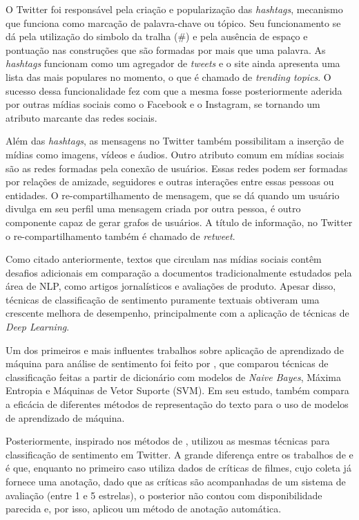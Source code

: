 O Twitter foi responsável pela criação e popularização das \textit{hashtags},
mecanismo que funciona como marcação de palavra-chave ou tópico.
Seu funcionamento se dá pela utilização do simbolo da tralha (\#) e pela ausência
de espaço e pontuação nas construções que são formadas por mais que uma palavra.
As \textit{hashtags} funcionam como um agregador de \textit{tweets} e o site
ainda apresenta uma lista das mais populares no momento, o que é chamado de
\textit{trending topics}.
O sucesso dessa funcionalidade fez com que a mesma fosse posteriormente aderida
por outras mídias sociais como o Facebook e o Instagram, se tornando um
atributo marcante das redes sociais.

Além das \textit{hashtags}, as mensagens no Twitter também possibilitam a
inserção de mídias como imagens, vídeos e áudios.
Outro atributo comum em mídias sociais são as redes formadas pela conexão de
usuários.
Essas redes podem ser formadas por relações de amizade, seguidores e outras
interações entre essas pessoas ou entidades.
O re-compartilhamento de mensagem, que se dá quando um usuário divulga em seu
perfil uma mensagem criada por outra pessoa, é outro componente capaz de gerar
grafos de usuários.
A título de informação, no Twitter o re-compartilhamento também é chamado de
\textit{retweet}.

Como citado anteriormente, textos que circulam nas mídias sociais contêm
desafios adicionais em comparação a documentos tradicionalmente estudados pela
área de NLP, como artigos jornalísticos e avaliações de produto.
Apesar disso, técnicas de classificação de sentimento puramente textuais
obtiveram uma crescente melhora de desempenho, principalmente com a aplicação de
técnicas de \textit{Deep Learning}.

Um dos primeiros e mais influentes trabalhos sobre aplicação de aprendizado de
máquina para análise de sentimento foi feito por \citet{pang02}, que comparou
técnicas de classificação feitas a partir de dicionário com modelos de
\textit{Naive Bayes}, Máxima Entropia e Máquinas de Vetor Suporte (SVM).
Em seu estudo, \citet{pang02} também compara a eficácia de diferentes métodos
de representação do texto para o uso de modelos de aprendizado de máquina.

Posteriormente, inspirado nos métodos de \citet{pang02}, \citet{go09} utilizou
as mesmas técnicas para classificação de sentimento em Twitter.
A grande diferença entre os trabalhos de \citet{pang02} e \citet{go09} é que,
enquanto no primeiro caso utiliza dados de críticas de filmes, cujo coleta já
fornece uma anotação, dado que as críticas são acompanhadas de um sistema de
avaliação (entre 1 e 5 estrelas), o posterior
não contou com disponibilidade parecida e, por isso, aplicou um método de
anotação automática.

